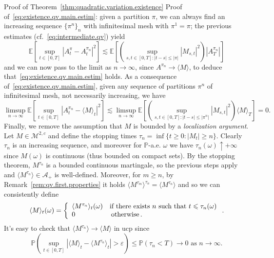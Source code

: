 \documentclass{article}
\newcommand{\emph}[1]{{\em #1\/}}
\newcommand{\textbf}[1]{\text{{\bfseries{#1}}}}
\newenvironment{proof*}[1]{\noindent\textbf{#1\ }}{\hspace*{\fill}$\Box$\medskip}
\newcommand{\1}{\1}
\begin{document}
{\begin{proof*}{Proof of Theorem~\ref{thm:quadratic.variation.existence}}
  \textbf{Step 5.} Proof of~\eqref{eq:existence.qv.main.estim}: given a
  partition $\pi$, we can always find an increasing sequence $\{ \pi^n \}_n$
  with infinitesimal mesh with $\pi^1 = \pi$; the previous estimates
  (cf.~\eqref{eq:intermediate.qv}) yield
  \[ \mathbb{E} [\sup_{t \in [0, T]} | A^{\pi}_t - A^{\pi_n}_t |^2] \lesssim
     \mathbb{E} [(\sup_{s, t \in [0, T] : | t - s | \leqslant | \pi |} | M_{s,
     t} |^2)  | A^{\pi_n}_T |] \]
  and we can now pass to the limit as $n \rightarrow \infty$, since $A^{\pi_n}
  \rightarrow \langle M \rangle$, to deduce
  that~\eqref{eq:existence.qv.main.estim} holds. As a consequence
  of~\eqref{eq:existence.qv.main.estim}, given any sequence of partitions
  $\pi^n$ of infinitesimal mesh, not necessarily increasing, we have
  \[ \limsup_{n \rightarrow \infty} \mathbb{E} [\sup_{t \in [0, T]} |
     A^{\pi_n}_t - \langle M \rangle_t |^2] \lesssim \limsup_{n \rightarrow
     \infty} \mathbb{E} [(\sup_{s, t \in [0, T] : | t - s | \leqslant | \pi^n
     |} | M_{s, t} |^2) \langle M \rangle_T] = 0. \]
  {\hspace{1.5em}}\textbf{Step 6.} Finally, we remove the assumption that
  $M$ is bounded by a {\emph{localization argument}}. Let $M \in
  \mathcal{M}^{2, c}$ and define the stopping times $\tau_n = \inf \{ t
  \geqslant 0 : | M_t | \geqslant n \}$. Clearly $\tau_n$ is an increasing
  sequence, and moreover for $\mathbb{P}$-a.e. $\omega$ we have $\tau_n
  (\omega) \uparrow + \infty$ since $M (\omega)$ is continuous (thus bounded
  on compact sets). By the stopping theorem, $M^{\tau_n}$ is a bounded
  continuous martingale, so the previous steps apply and $\langle M^{\tau_n}
  \rangle \in \mathcal{A}_+$ is well-defined. Moreover, for $m \geqslant n$,
  by Remark~\ref{rem:qv.first.properties} it holds $\langle M^{\tau_m}
  \rangle^{\tau_n} = \langle M^{\tau_n} \rangle$ and so we can consistently
  define
  \[ \langle M \rangle_t (\omega) = \left\{\begin{array}{l}
       \langle M^{\tau_n} \rangle_t (\omega)  \quad \text{if there exists $n$
       such that } t \leqslant \tau_n (\omega)\\
       0 \hspace{5.1em} \operatorname{otherwise} .
     \end{array}\right. . \]
  It's easy to check that $\langle M^{\tau_n} \rangle \rightarrow \langle M
  \rangle$ in ucp since
  \[ \mathbb{P} (\sup_{t \in [0, T]} | \langle M \rangle_t - \langle
     M^{\tau_n} \rangle_t | > \varepsilon) \leqslant \mathbb{P} (\tau_n < T)
     \rightarrow 0 \text{ as } n \rightarrow \infty . \]

\end{proof*}}
\end{document}
